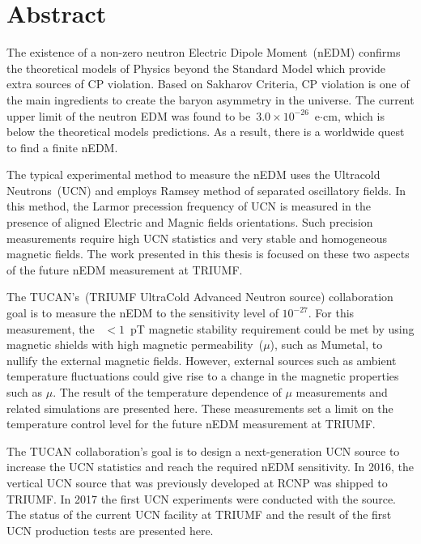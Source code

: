 \documentclass[12pt,a4paper]{book}
\begin{document}
\renewcommand{\thepage}{\roman{page}}
\chapter*{Abstract}
The existence of a non-zero neutron Electric Dipole Moment~(nEDM)
confirms the theoretical models of Physics beyond the Standard Model
which provide extra sources of CP violation. Based on Sakharov
Criteria, CP violation is one of the main ingredients to create the
baryon asymmetry in the universe. The current upper limit of the
neutron EDM was found to be~$3.0 \times 10^{-26}$~e$\cdot$cm, which is
below the theoretical models predictions. As a result, there is a
worldwide quest to find a finite nEDM.

The typical experimental method to measure the nEDM uses the Ultracold
Neutrons~(UCN) and employs Ramsey method of separated oscillatory
fields. In this method, the Larmor precession frequency of UCN is
measured in the presence of aligned Electric and Magnic fields
orientations. Such precision measurements require high UCN statistics
and very stable and homogeneous magnetic fields.
The work presented in this thesis is focused on these two aspects of
the future nEDM measurement at TRIUMF.

The TUCAN's~(TRIUMF UltraCold Advanced Neutron source) collaboration
goal is to measure the nEDM to the sensitivity level of
$10^{-27}$. For this measurement, the~ $<1$~pT magnetic stability
requirement could be met by using magnetic shields with high magnetic
permeability~($\mu$), such as Mumetal, to nullify the external
magnetic fields. However, external sources such as ambient temperature
fluctuations could give rise to a change in the magnetic properties
such as $\mu$. The result of the temperature dependence of $\mu$
measurements and related simulations are presented here.
These measurements set a limit on the temperature control level for
the future nEDM measurement at TRIUMF.

The TUCAN collaboration's goal is to design a next-generation UCN
source to increase the UCN statistics and reach the required nEDM
sensitivity. In 2016, the vertical UCN source that was previously
developed at RCNP was shipped to TRIUMF. In 2017 the first UCN
experiments were conducted with the source. The status of the current
UCN facility at TRIUMF and the result of the first UCN production
tests are presented here.
\end{document}
